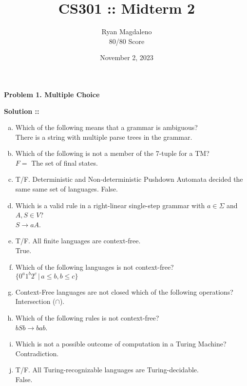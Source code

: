 \documentclass[11pt]{article}
\date{November 2, 2023}
\title{CS301 :: Midterm 2}
\author{Ryan Magdaleno\\80/80 Score}
\begin{document}
\maketitle


\textbf{Problem 1. Multiple Choice}

\vspace{5px}\textbf{Solution ::} 
\begin{enumerate}[a)]
\item Which of the following means that a grammar is ambiguous? \\
There is a string with multiple parse trees in the grammar.
\item Which of the following is not a member of the 7-tuple for a TM? \\
$F =$ The set of final states.
\item T/F. Deterministic and Non-deterministic Pushdown Automata decided the same
same set of languages.
False.
\item Which is a valid rule in a right-linear single-step grammar with $a\in\Sigma$
and $A, S\in V$? \\
$S\rightarrow aA$.
\item T/F. All finite languages are context-free. \\ True.
\item Which of the following languages is not context-free? \\
$\{0^a1^b2^c \,|\, a\le b, b\le c\}$
\item Context-Free languages are not closed which of the following operations? \\
Intersection ($\cap$).
\item Which of the following rules is not context-free? \\
$bSb\rightarrow bab$.
\item Which is not a possible outcome of computation in a Turing Machine? \\
Contradiction.
\item T/F. All Turing-recognizable languages are Turing-decidable. \\
False.
\end{enumerate}
\pagebreak

\end{document}
